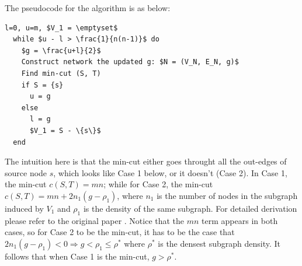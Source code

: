 \documentclass{article}
\begin{document}
The pseudocode for the algorithm is as below:

\begin{lstlisting}[mathescape=true]
  l=0, u=m, $V_1 = \emptyset$
  while $u - l > \frac{1}{n(n-1)}$ do
    $g = \frac{u+l}{2}$
    Construct network the updated g: $N = (V_N, E_N, g)$
    Find min-cut (S, T)
    if S = {s}
      u = g
    else
      l = g
      $V_1 = S - \{s\}$
  end
\end{lstlisting}

The intuition here is that the min-cut either goes throught all the out-edges of source node $s$, which looks like Case 1 below, or it doesn't (Case 2). In Case 1, the min-cut $c(S, T) = mn$; while for Case 2, the min-cut $c(S, T) = mn + 2n_1(g - \rho_1)$, where $n_1$ is the number of nodes in the subgraph induced by $V_1$ and $\rho_1$ is the density of the same subgraph. For detailed derivation please refer to the original paper \cite{Goldberg:CSD-84-171}. Notice that the $mn$ term appears in both cases, so for Case 2 to be the min-cut, it has to be the case that $2n_1(g - \rho_1) < 0 \Rightarrow g < \rho_1 \leq \rho^*$ where $\rho^*$ is the densest subgraph density. It follows that when Case 1 is the min-cut, $g > \rho^*$.
\end{document}
